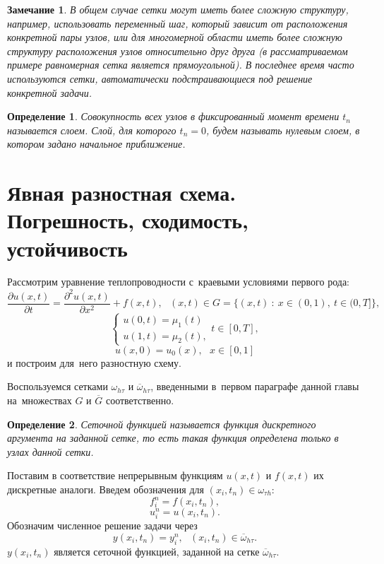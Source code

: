 \documentclass[11pt,a4paper,twoside]{report}
\numberwithin{equation}{section}
\newtheorem*{definition}{Определение}
\theoremstyle{definition}
\theoremstyle{plain}
\newtheorem*{note*}{Замечание}
\begin{document}
%
\begin{note*}
%
    В общем случае сетки могут иметь более сложную структуру, например,
    использовать переменный шаг, который зависит от расположения конкретной
    пары узлов, или для многомерной области иметь более сложную структуру
    расположения узлов относительно
    друг друга (в рассматриваемом примере равномерная сетка является прямоугольной).
    В последнее время часто используются сетки, автоматически
    подстраивающиеся под решение конкретной задачи.
%
\end{note*}
%
\begin{definition}
%
    Совокупность всех узлов в фиксированный момент времени $t_n$ называется
    слоем. Слой, для которого $t_n = 0$, будем называть нулевым слоем, в котором
    задано начальное приближение.
%
\end{definition}
%
%
\section{Явная разностная схема. Погрешность, сходимость, устойчивость}

Рассмотрим уравнение теплопроводности с~краевыми условиями первого рода:
%
\begin{equation}
%
    \label{temp_equ_2}
    \frac{\partial u(x,t)}{\partial t} =
    \frac{\partial^2u(x,t)}{\partial x^2} + f(x,t),
    ~~~(x,t) \in G = \{(x, t)~:~x \in (0,1),~t\in (0,T]\},
%
\end{equation}
%
%
\begin{equation}
%
    \label{bord_2}
    \begin{cases}
        u(0,t) = \mu_1(t) \\
        u(1,t) = \mu_2(t),
    \end{cases}
    t\in [0,T],
%
\end{equation}
%
%
\begin{equation}
%
    \label{start_val_2}
    u(x,0) = u_0(x),~~~x\in[0,1]
%
\end{equation}
и построим для~него разностную схему.

Воспользуемся сетками $\omega_{h \tau}$ и $\overline{\omega}_{h \tau}$,
введенными в~первом параграфе данной главы на~множествах $G$ и
$\overline{G}$ соответственно.

%
\begin{definition}
%
    Сеточной функцией называется функция дискретного аргумента на заданной сетке,
    то есть такая функция определена только в узлах данной сетки.
%
\end{definition}
%
Поставим в соответствие непрерывным функциям $u(x,t)$ и $f(x,t)$ их
дискретные аналоги. Введем обозначения для $(x_i, t_n) \in \omega_{\tau h}$:
%
$$
    f_i^n = f(x_i,t_n),
$$
%
$$
    u_i^n = u(x_i,t_n).
$$
%
Обозначим численное решение задачи через
%
$$
    y(x_i,t_n) = y_i^n,  ~~~(x_i, t_n) \in \overline{\omega}_{h \tau}.
$$
%
$y(x_i, t_n)$ является сеточной функцией, заданной на сетке
$\overline{\omega}_{h \tau}$.
\end{document}
